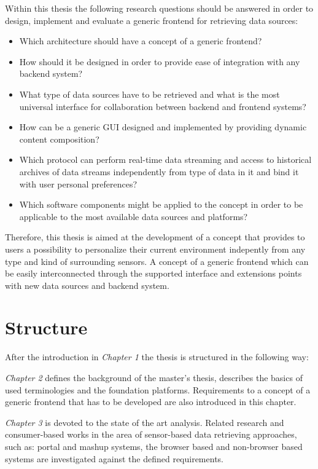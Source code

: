        Within this thesis the following research questions should be answered in order to design, implement and evaluate a generic frontend for retrieving data sources: 
       \begin{itemize}
       \item Which architecture should have a concept of a generic frontend?
       \item How should it be designed in order to provide ease of integration with any backend system?
       \item What type of data sources have to be retrieved and what is the most universal interface for collaboration between backend and frontend systems?
       \item How can be a generic GUI designed and implemented by providing dynamic content composition?
       \item Which protocol can perform real-time data streaming and access to historical archives of data streams independently from type of data in it and bind it with user personal preferences?
       \item Which software components might be applied to the concept in order to be applicable to the most available data sources and platforms?
       \end{itemize}

     Therefore, this thesis is aimed at the development of a concept that provides to users a possibility to personalize their current environment indepently from any type and kind of surrounding sensors. A concept of a generic frontend which can be easily interconnected through the supported interface and extensions points with new data sources and backend system.

\section{Structure}

After the introduction in \emph{Chapter 1} the thesis is structured in the following way:

\emph{Chapter 2} defines the background of the master's thesis, describes the basics of used terminologies and the foundation platforms. Requirements to a concept of a generic frontend that has to be developed are also introduced in this chapter.

\emph{Chapter 3} is devoted to the state of the art analysis. Related research and consumer-based works in the area of sensor-based data retrieving approaches, such as: portal and mashup systems, the browser based and non-browser based systems are investigated against the defined requirements.

